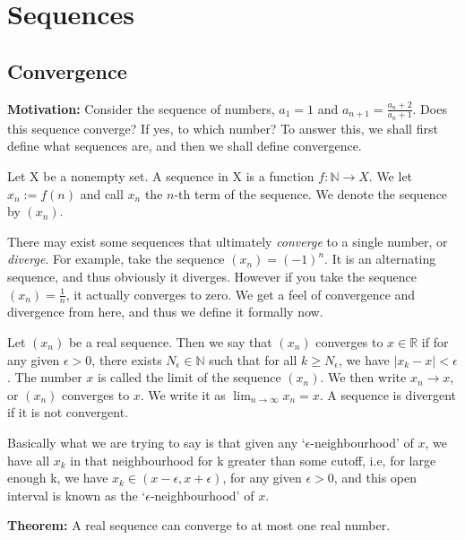 \documentclass[a4paper,11pt,abstracton]{scrartcl}
\newcommand{\RR}{\mathbb{R}}
\newcommand{\NN}{\mathbb{N}}
\theoremstyle{dotlessP}
\theoremstyle{dotlessS}
\theoremstyle{remark}
\theoremstyle{definition}
\begin{document}
\section{Sequences}
\subsection{Convergence}
\textbf{Motivation:} Consider the sequence of numbers, $a_1=1$ and $a_{n+1}=\frac{a_n+2}{a_n+1}$. Does this sequence converge? If yes, to which number? To answer this, we shall first define what sequences are, and then we shall define convergence.

\begin{definition_box}
Let X be a nonempty set. A sequence in X is a function $f:\NN \rightarrow X$. We let $x_n:=f(n)$ and call $x_n$ the $n$-th term of the sequence. We denote the sequence by $(x_n)$.  
\end{definition_box}

There may exist some sequences that ultimately \emph{converge} to a single number, or \emph{diverge}. For example, take the sequence $(x_n)=(-1)^n$. It is an alternating sequence, and thus obviously it diverges. However if you take the sequence $(x_n)=\frac{1}{n}$, it actually converges to zero. We get a feel of convergence and divergence from here, and thus we define it formally now.

\begin{definition_box}
Let $(x_n)$ be a real sequence. Then we say that $(x_n)$ converges to $x \in \RR$ if for any given $\epsilon > 0$, there exists $N_\epsilon \in \NN$ such that for all $k \ge N_\epsilon$, we have $|x_k-x| < \epsilon$. The number $x$ is called the limit of the sequence $(x_n)$. We then write $x_n \rightarrow x$, or $(x_n)$ converges to $x$. We write it as $\lim_{n \rightarrow \infty} x_n = x$. A sequence is divergent if it is not convergent. 
\end{definition_box}

Basically what we are trying to say is that given any `$\epsilon$-neighbourhood' of $x$, we have all $x_k$ in that neighbourhood for k greater than some cutoff, i.e, for large enough k, we have $x_k \in (x-\epsilon, x+\epsilon)$, for any given $\epsilon > 0$, and this open interval is known as the `$\epsilon$-neighbourhood' of $x$.

\begin{problem_box}
\textbf{Theorem:}
A real sequence can converge to at most one real number.
\end{problem_box}
\end{document}
